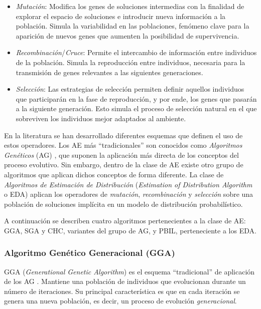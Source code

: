\begin{itemize}
\item \emph{Mutación}: Modifica los genes de soluciones intermedias con la finalidad de explorar el espacio de soluciones e introducir nueva información a la población. Simula la variabilidad en las poblaciones, fenómeno clave para la aparición de nuevos genes que aumenten la posibilidad de supervivencia.
\item \emph{Recombinación}/\emph{Cruce}: Permite el intercambio de información entre individuos de la población. Simula la reproducción entre individuos, necesaria para la transmisión de genes relevantes a las siguientes generaciones.
\item \emph{Selección}: Las estrategias de selección permiten definir aquellos individuos que participarán en la fase de reproducción, y por ende, los genes que pasarán a la siguiente generación. Esto simula el proceso de selección natural en el que sobreviven los individuos mejor adaptados al ambiente.
\end{itemize}

En la literatura se han desarrollado diferentes esquemas que definen el uso de estos operadores. Los AE más ``tradicionales'' son conocidos como \emph{Algoritmos Genéticos} (AG) \cite{holland1975adaptation}, que suponen la aplicación más directa de los conceptos del proceso evolutivo. Sin embargo, dentro de la clase de AE existe otro grupo de algoritmos que aplican dichos conceptos de forma diferente. La clase de \emph{Algoritmos de Estimación de Distribución} (\emph{Estimation of Distribution Algorithm} o EDA) aplican los operadores de \emph{mutación}, \emph{recombinación} y \emph{selección} sobre una población de soluciones implícita en un modelo de distribución probabilístico.

A continuación se describen cuatro algoritmos pertenecientes a la clase de AE: GGA, SGA y CHC, variantes del grupo de AG, y PBIL, perteneciente a los EDA.

\subsubsection{Algoritmo Genético Generacional (GGA)}

GGA (\emph{Generational Genetic Algorithm}) es el esquema ``tradicional'' de aplicación de los AG \cite{back1996evolutionary,Muhlenbein91evolutionin}. Mantiene una población de individuos que evolucionan durante un número de iteraciones. Su principal característica es que en cada iteración se genera una nueva población, es decir, un proceso de evolución \emph{generacional}.

